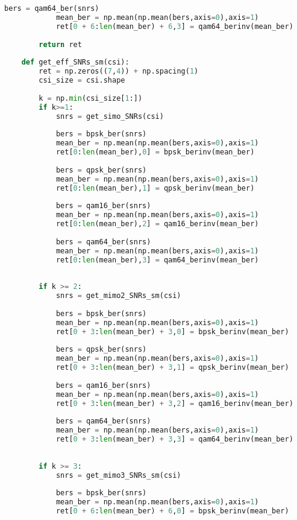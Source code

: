 \documentclass[UTF8]{article}
\begin{document}
\begin{lstlisting}[language=Python, caption=$ get\_SNRs.py $]
            bers = qam64_ber(snrs)
            mean_ber = np.mean(np.mean(bers,axis=0),axis=1)
            ret[0 + 6:len(mean_ber) + 6,3] = qam64_berinv(mean_ber)
    
        return ret
    
    def get_eff_SNRs_sm(csi):
        ret = np.zeros((7,4)) + np.spacing(1)
        csi_size = csi.shape
    
        k = np.min(csi_size[1:])
        if k>=1:
            snrs = get_simo_SNRs(csi)
    
            bers = bpsk_ber(snrs)
            mean_ber = np.mean(np.mean(bers,axis=0),axis=1)
            ret[0:len(mean_ber),0] = bpsk_berinv(mean_ber)
    
            bers = qpsk_ber(snrs)
            mean_ber = np.mean(np.mean(bers,axis=0),axis=1)
            ret[0:len(mean_ber),1] = qpsk_berinv(mean_ber)
    
            bers = qam16_ber(snrs)
            mean_ber = np.mean(np.mean(bers,axis=0),axis=1)
            ret[0:len(mean_ber),2] = qam16_berinv(mean_ber)
    
            bers = qam64_ber(snrs)
            mean_ber = np.mean(np.mean(bers,axis=0),axis=1)
            ret[0:len(mean_ber),3] = qam64_berinv(mean_ber)
    
        
        if k >= 2:
            snrs = get_mimo2_SNRs_sm(csi)
    
            bers = bpsk_ber(snrs)
            mean_ber = np.mean(np.mean(bers,axis=0),axis=1)
            ret[0 + 3:len(mean_ber) + 3,0] = bpsk_berinv(mean_ber)
    
            bers = qpsk_ber(snrs)
            mean_ber = np.mean(np.mean(bers,axis=0),axis=1)
            ret[0 + 3:len(mean_ber) + 3,1] = qpsk_berinv(mean_ber)
    
            bers = qam16_ber(snrs)
            mean_ber = np.mean(np.mean(bers,axis=0),axis=1)
            ret[0 + 3:len(mean_ber) + 3,2] = qam16_berinv(mean_ber)
    
            bers = qam64_ber(snrs)
            mean_ber = np.mean(np.mean(bers,axis=0),axis=1)
            ret[0 + 3:len(mean_ber) + 3,3] = qam64_berinv(mean_ber)
    
    
        if k >= 3:
            snrs = get_mimo3_SNRs_sm(csi)
    
            bers = bpsk_ber(snrs)
            mean_ber = np.mean(np.mean(bers,axis=0),axis=1)
            ret[0 + 6:len(mean_ber) + 6,0] = bpsk_berinv(mean_ber)
    

\end{lstlisting}
\end{document}
